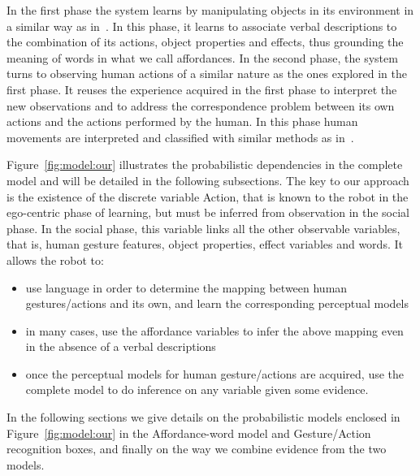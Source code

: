 In the first phase the system learns by manipulating objects in its environment in a similar way as in~\cite{salvi:2012:smcb}.
In this phase, it learns to associate verbal descriptions to the combination of its actions, object properties and effects, thus grounding the meaning of words in what we call affordances.
In the second phase, the system turns to observing human actions of a similar nature as the ones explored in the first phase.
It reuses the experience acquired in the first phase to interpret the new observations and to address the correspondence problem between its own actions and the actions performed by the human.
In this phase human movements are interpreted and classified with similar methods as in~\cite{saponaro:2013:crhri}.

Figure~\ref{fig:model:our} illustrates the probabilistic dependencies in the complete model and will be detailed in the following subsections.
The key to our approach is the existence of the discrete variable Action, that is known to the robot in the ego-centric phase of learning, but must be inferred from observation in the social phase.
In the social phase, this variable links all the other observable variables, that is, human gesture features, object properties, effect variables and words.
It allows the robot to:
\begin{itemize}
\item use language in order to determine the mapping between human gestures/actions and its own, and learn the corresponding perceptual models
\item in many cases, use the affordance variables to infer the above mapping even in the absence of a verbal descriptions
\item once the perceptual models for human gesture/actions are acquired, use the complete model to do inference on any variable given some evidence.
\end{itemize}
In the following sections we give details on the probabilistic models enclosed in Figure~\ref{fig:model:our} in the Affordance-word model and Gesture/Action recognition boxes, and finally on the way we combine evidence from the two models.


